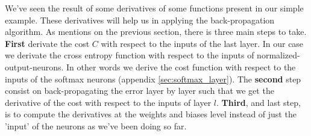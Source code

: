 			We've seen the result of some derivatives of some functions present in our simple example. These derivatives will help us in applying the back-propagation algorithm. As mentions on the previous section, there is three main steps to take. \textbf{First} derivate the cost $C$ with respect to the inputs of the last layer. In our case we derivate the cross entropy function with respect to the inputs of normalized-output-neurons. In other words we derive the cost function with respect to the inputs of the softmax neurons (appendix \ref{sec:softmax_layer}). The \textbf{second} step consist on back-propagating the error layer by layer such that we get the derivative of the cost with respect to the inputs of layer $l$. \textbf{Third}, and last step, is to compute the derivatives at the weights and biases level instead of just the 'input' of the neurons as we've been doing so far.
